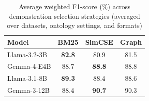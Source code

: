 \begin{table}[htbp]
\centering
\caption{Average weighted F1-score (\%) across demonstration selection strategies (averaged over datasets, ontology settings, and formats)}
\label{tab:f1_avg_comparison}
\begin{tabular}{lccc}
\toprule
Model & BM25 & SimCSE & Graph \\
\midrule
Llama-3.2-3B         & \textbf{82.8} & 80.9 & 81.5 \\
Gemma-4-E4B          & 88.7 & \textbf{88.8} & 88.8 \\
Llama-3.1-8B         & \textbf{89.3} & 88.4 & 88.6 \\
Gemma-3-12B          & 88.4 & \textbf{90.7} & 90.3 \\
\bottomrule
\end{tabular}
\end{table}
